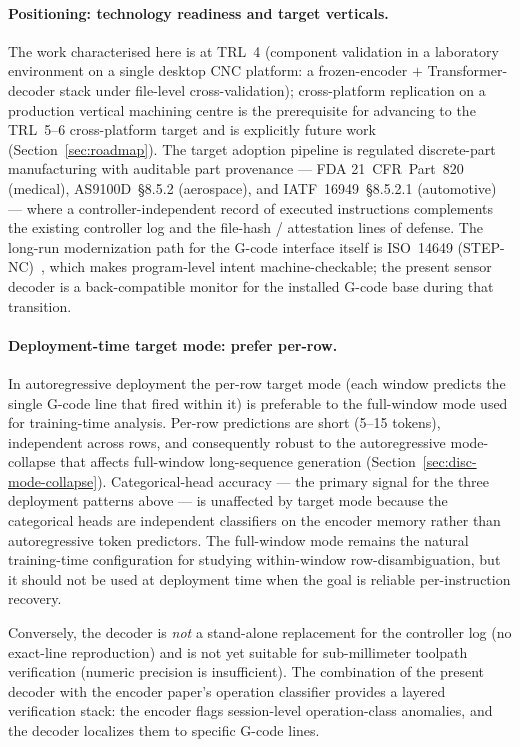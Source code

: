 \documentclass[sensors,article,submit,moreauthors,pdftex]{Definitions/mdpi}
\begin{document}
\paragraph{Positioning: technology readiness and target verticals.} The work characterised here is at TRL~4 (component validation in a laboratory environment on a single desktop CNC platform: a frozen-encoder $+$ Transformer-decoder stack under file-level cross-validation); cross-platform replication on a production vertical machining centre is the prerequisite for advancing to the TRL~5--6 cross-platform target and is explicitly future work (Section~\ref{sec:roadmap}). The target adoption pipeline is regulated discrete-part manufacturing with auditable part provenance --- FDA 21~CFR~Part~820 (medical), AS9100D~\S{}8.5.2 (aerospace), and IATF~16949~\S{}8.5.2.1 (automotive) --- where a controller-independent record of executed instructions complements the existing controller log and the file-hash / attestation lines of defense. The long-run modernization path for the G-code interface itself is ISO~14649 (STEP-NC)~\cite{iso14649}, which makes program-level intent machine-checkable; the present sensor decoder is a back-compatible monitor for the installed G-code base during that transition.

\paragraph{Deployment-time target mode: prefer per-row.} In autoregressive deployment the per-row target mode (each window predicts the single G-code line that fired within it) is preferable to the full-window mode used for training-time analysis. Per-row predictions are short (5--15 tokens), independent across rows, and consequently robust to the autoregressive mode-collapse that affects full-window long-sequence generation (Section~\ref{sec:disc-mode-collapse}). Categorical-head accuracy --- the primary signal for the three deployment patterns above --- is unaffected by target mode because the categorical heads are independent classifiers on the encoder memory rather than autoregressive token predictors. The full-window mode remains the natural training-time configuration for studying within-window row-disambiguation, but it should not be used at deployment time when the goal is reliable per-instruction recovery.

Conversely, the decoder is \emph{not} a stand-alone replacement for the controller log (no exact-line reproduction) and is not yet suitable for sub-millimeter toolpath verification (numeric precision is insufficient). The combination of the present decoder with the encoder paper's operation classifier provides a layered verification stack: the encoder flags session-level operation-class anomalies, and the decoder localizes them to specific G-code lines.
\end{document}
